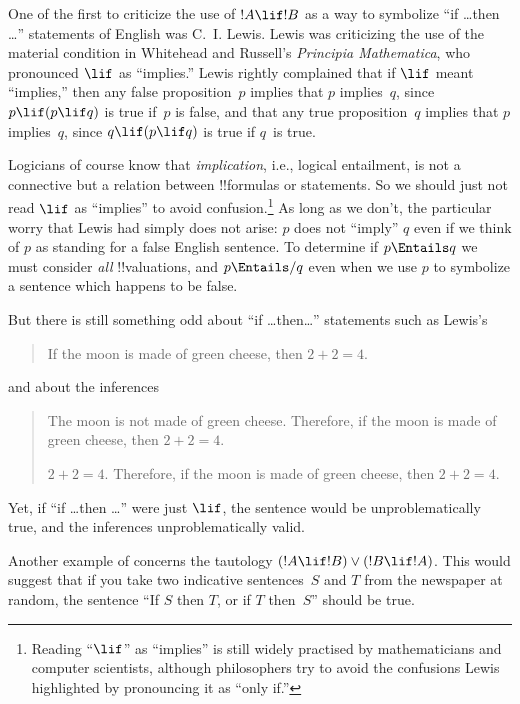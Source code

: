 \documentclass[../../../include/open-logic-section]{subfiles}
\begin{document}

One of the first to criticize the use of $!A \lif !B$ as a way to
symbolize ``if \dots then \dots'' statements of English was
C.~I. Lewis. Lewis was criticizing the use of the material condition
in Whitehead and Russell's \emph{Principia Mathematica}, who
pronounced $\lif$ as ``implies.''  Lewis rightly complained that if
$\lif$ meant ``implies,'' then any false proposition~$p$ implies that
$p$ implies~$q$, since $p \lif (p \lif q)$ is true if~$p$ is false,
and that any true proposition~$q$ implies that $p$ implies~$q$, since
$q \lif (p \lif q)$ is true if $q$~is true.

Logicians of course know that \emph{implication}, i.e., logical
entailment, is not a connective but a relation between !!{formula}s or
statements. So we should just not read $\lif$ as ``implies'' to avoid
confusion.\footnote{Reading ``$\lif$'' as ``implies'' is still widely
  practised by mathematicians and computer scientists, although
  philosophers try to avoid the confusions Lewis highlighted by
  pronouncing it as ``only if.''} As long as we don't, the particular
worry that Lewis had simply does not arise: $p$ does not ``imply'' $q$
even if we think of $p$ as standing for a false English sentence. To
determine if $p \Entails q$ we must consider \emph{all}
!!{valuation}s, and $p \Entails/ q$ even when we use $p$ to symbolize
a sentence which happens to be false.

But there is still something odd about ``if \dots then\dots''
statements such as Lewis's
\begin{quote}
If the moon is made of green cheese, then $2+2=4$.
\end{quote}
and about the inferences
\begin{quote}
  The moon is not made of green cheese. Therefore, if the moon is made
  of green cheese, then $2+2=4$.

  $2+2 = 4$. Therefore, if the moon is made
  of green cheese, then $2+2=4$.
\end{quote}
Yet, if ``if \dots then \dots'' were just $\lif$, the sentence would
be unproblematically true, and the inferences unproblematically valid.

Another example of concerns the tautology $(!A \lif !B) \lor (!B \lif
!A)$.  This would suggest that if you take two indicative
sentences~$S$ and $T$ from the newspaper at random, the sentence ``If
$S$ then $T$, or if $T$ then~$S$'' should be true.
\end{document}
